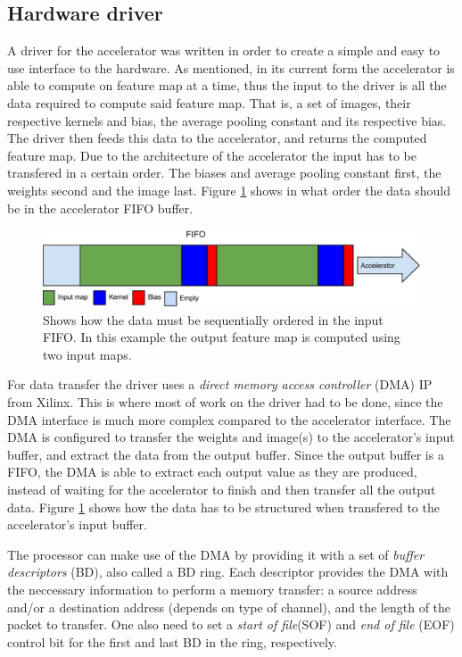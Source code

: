 \subsection{Hardware driver}

A driver for the accelerator was written in order to create a simple and easy to use interface to the hardware. As mentioned, in its current form the accelerator is able to compute on feature map at a time, thus the input to the driver is all the data required to compute said feature map. That is, a set of images, their respective kernels and bias, the average pooling constant and its respective bias. The driver then feeds this data to the accelerator, and returns the computed feature map. Due to the architecture of the accelerator the input has to be transfered in a certain order. The biases and average pooling constant first, the weights second and the image last. Figure \ref{fig_fifo_content} shows in what order the data should be in the accelerator FIFO buffer.


\begin{figure}[h!]
  \centering
      \includegraphics[width=1.0\textwidth]{Figures/Method/FIFO_content}
    \caption{Shows how the data must be sequentially ordered in the input FIFO. In this example the output feature map is computed using two input maps.}
    \label{fig_fifo_content}
\end{figure}

For data transfer the driver uses a \textit{direct memory access controller} (DMA) IP from Xilinx. This is where most of work on the driver had to be done, since the DMA interface is much more complex compared to the accelerator interface. The DMA is configured to transfer the weights and image(s) to the accelerator's input buffer, and extract the data from the output buffer. Since the output buffer is a FIFO, the DMA is able to extract each output value as they are produced, instead of waiting for the accelerator to finish and then transfer all the output data. Figure \ref{fig_fifo_content} shows how the data has to be structured when transfered to the accelerator's input buffer.

The processor can make use of the DMA by providing it with a set of \textit{buffer descriptors} (BD), also called a BD ring. Each descriptor provides the DMA with the neccessary information to perform a memory transfer: a source address and/or a destination address (depends on type of channel), and the length of the packet to transfer. One also need to set a \textit{start of file}(SOF) and \textit{end of file} (EOF) control bit for the first and last BD in the ring, respectively. 

